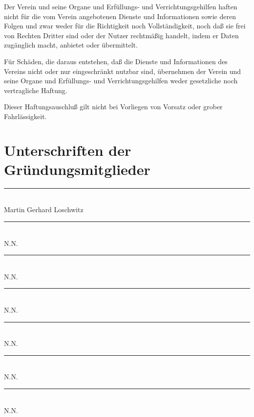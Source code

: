 \documentclass[draft]{scrartcl}
\begin{document}
\begin{contract}

Der Verein und seine Organe und Erfüllungs- und Verrichtungsgehilfen haften
nicht für die vom Verein angebotenen Dienste und Informationen sowie deren
Folgen und zwar weder für die Richtigkeit noch Vollständigkeit, noch daß sie
frei von Rechten Dritter sind oder der Nutzer rechtmäßig handelt, indem er
Daten zugänglich macht, anbietet oder übermittelt.

Für Schäden, die daraus entstehen, daß die Dienste und Informationen des
Vereins nicht oder nur eingeschränkt nutzbar sind, übernehmen der Verein und
seine Organe und Erfüllungs- und Verrichtungsgehilfen weder gesetzliche noch
vertragliche Haftung.

Dieser Haftungsauschluß gilt nicht bei Vorliegen von Vorsatz oder grober
Fahr\-läss\-ig\-keit.

\end{contract}

\pagebreak\section*{Unterschriften der Gründungsmitglieder}

\vspace{3em}

\rule{6cm}{0.4pt} \\
\noindent Martin Gerhard Loschwitz \\
\vspace{2em}

\rule{6cm}{0.4pt} \\
\noindent N.N. \\
\vspace{2em}

\rule{6cm}{0.4pt} \\
\noindent N.N. \\
\vspace{2em}

\rule{6cm}{0.4pt} \\
\noindent N.N. \\
\vspace{2em}

\rule{6cm}{0.4pt} \\
\noindent N.N. \\
\vspace{2em}

\rule{6cm}{0.4pt} \\
\noindent N.N. \\
\vspace{2em}

\rule{6cm}{0.4pt} \\
\noindent N.N.
\end{document}
